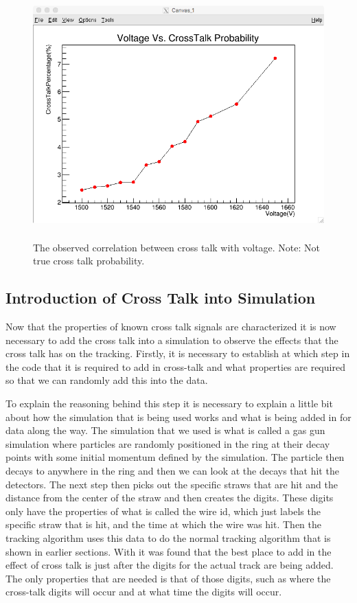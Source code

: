 \documentclass[./Thesis]{subfiles}
\begin{document}
\begin{figure}
	\centerline{\includegraphics[height=95mm]{VoltageVsCrossTalkProbabilityMod3Stat1.png}}
	\caption[ Cross Talk Vs. Voltage (V)]{ The observed correlation between cross talk with voltage. Note: Not true cross talk probability.}
	\label{fig:NoiseVolts}
\end{figure}

	
	
\subsection{Introduction of Cross Talk into Simulation}

	Now that the properties of known cross talk signals are characterized it is now necessary to add the cross talk into a simulation to observe the effects that the cross talk has on the tracking. Firstly, it is necessary to establish at which step in the code that it is required to add in cross-talk and what properties are required so that we can randomly add this into the data. 
	
	To explain the reasoning behind this step it is necessary to explain a little bit about how the simulation that is being used works and what is being added in for data along the way.  The simulation that we used is what is called a gas gun simulation where particles are randomly positioned in the ring at their decay points with some initial momentum defined by the simulation. The particle then decays to anywhere in the ring and then we can look at the decays that hit the detectors.  The next step then picks out the specific straws that are hit and the distance from the center of the straw and then creates the digits.  These digits only have the properties of what is called the wire id, which just labels the specific straw that is hit, and the time at which the wire was hit.  Then the tracking algorithm uses this data to do the normal tracking algorithm that is shown in earlier sections.  With it was found that the best place to add in the effect of cross talk is just after the digits for the actual track are being added.  The only properties that are needed is that of those digits, such as where the cross-talk digits will occur and at what time the digits will occur. 
	
\end{document}
